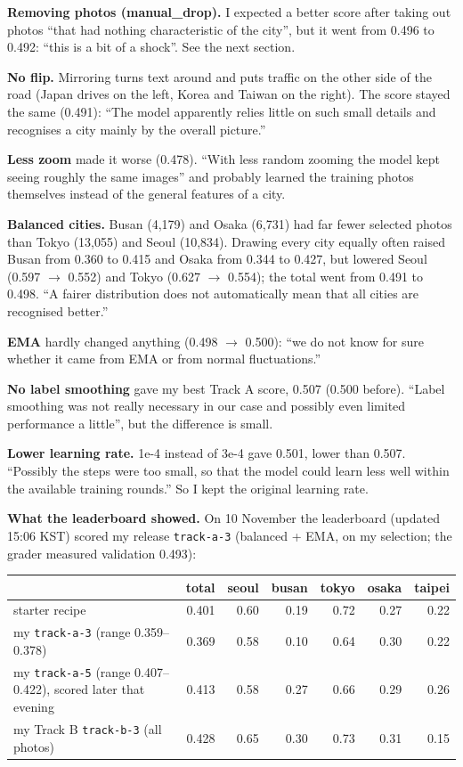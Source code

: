 \documentclass[11pt]{article}
\begin{document}
\textbf{Removing photos (manual\_drop).} I expected a better score after taking
out photos ``that had nothing characteristic of the city'', but it went from
0.496 to 0.492: ``this is a bit of a shock''. See the next section.

\textbf{No flip.} Mirroring turns text around and puts traffic on the other
side of the road (Japan drives on the left, Korea and Taiwan on the right).
The score stayed the same (0.491): ``The model apparently relies little on such
small details and recognises a city mainly by the overall picture.''

\textbf{Less zoom} made it worse (0.478). ``With less random zooming the model
kept seeing roughly the same images'' and probably learned the training photos
themselves instead of the general features of a city.

\textbf{Balanced cities.} Busan (4,179) and Osaka (6,731) had far fewer
selected photos than Tokyo (13,055) and Seoul (10,834). Drawing every city
equally often raised Busan from 0.360 to 0.415 and Osaka from 0.344 to 0.427,
but lowered Seoul (0.597 $\to$ 0.552) and Tokyo (0.627 $\to$ 0.554); the total
went from 0.491 to 0.498. ``A fairer distribution does not automatically mean
that all cities are recognised better.''

\textbf{EMA} hardly changed anything (0.498 $\to$ 0.500): ``we do not know for
sure whether it came from EMA or from normal fluctuations.''

\textbf{No label smoothing} gave my best Track A score, 0.507 (0.500 before).
``Label smoothing was not really necessary in our case and possibly even
limited performance a little'', but the difference is small.

\textbf{Lower learning rate.} 1e-4 instead of 3e-4 gave 0.501, lower than 0.507.
``Possibly the steps were too small, so that the model could learn less well
within the available training rounds.'' So I kept the original learning rate.

\textbf{What the leaderboard showed.} On 10 November the leaderboard
(updated 15:06 KST) scored my release \texttt{track-a-3} (balanced + EMA, on my
selection; the grader measured validation 0.493):

\begin{center}\footnotesize
\begin{tabular}{lrrrrrr}
\toprule
 & total & seoul & busan & tokyo & osaka & taipei \\
\midrule
starter recipe & 0.401 & 0.60 & 0.19 & 0.72 & 0.27 & 0.22 \\
my \texttt{track-a-3} (range 0.359--0.378) & 0.369 & 0.58 & 0.10 & 0.64 & 0.30 & 0.22 \\
my \texttt{track-a-5} (range 0.407--0.422), scored later that evening & 0.413 & 0.58 & 0.27 & 0.66 & 0.29 & 0.26 \\
my Track B \texttt{track-b-3} (all photos) & 0.428 & 0.65 & 0.30 & 0.73 & 0.31 & 0.15 \\
\bottomrule
\end{tabular}
\end{center}
\end{document}
